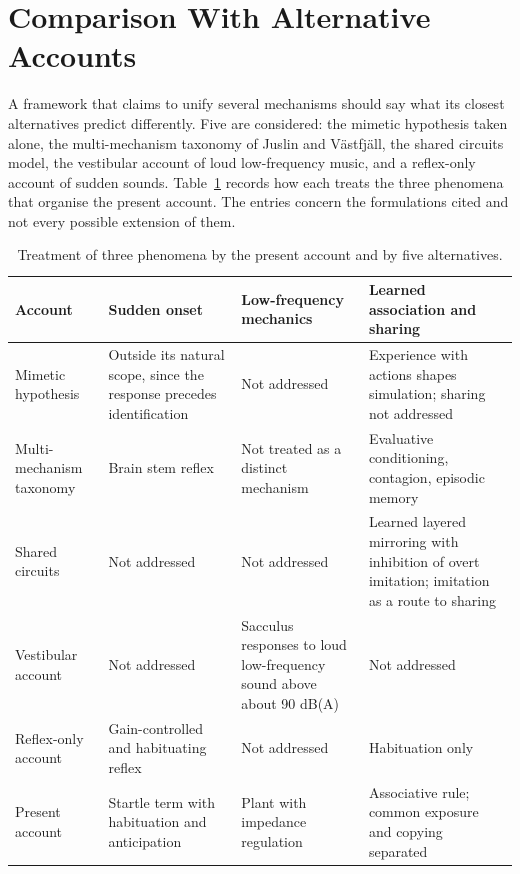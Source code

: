 \documentclass[11pt]{article}
\theoremstyle{plain}
\theoremstyle{definition}
\begin{document}
\section{Comparison With Alternative Accounts}\label{sec:compare}

A framework that claims to unify several mechanisms should say what its closest alternatives predict differently. Five are considered: the mimetic hypothesis taken alone, the multi-mechanism taxonomy of Juslin and V\"astfj\"all, the shared circuits model, the vestibular account of loud low-frequency music, and a reflex-only account of sudden sounds. Table~\ref{tab:compare} records how each treats the three phenomena that organise the present account. The entries concern the formulations cited and not every possible extension of them.

\begin{table}[t]
\centering
\small
\renewcommand{\arraystretch}{1.25}
\begin{tabular}{@{}>{\raggedright\arraybackslash}p{3.0cm}>{\raggedright\arraybackslash}p{3.7cm}>{\raggedright\arraybackslash}p{3.7cm}>{\raggedright\arraybackslash}p{4.0cm}@{}}
\toprule
Account & Sudden onset & Low-frequency mechanics & Learned association and sharing \\
\midrule
Mimetic hypothesis \citep{cox2016} & Outside its natural scope, since the response precedes identification & Not addressed & Experience with actions shapes simulation; sharing not addressed \\
Multi-mechanism taxonomy \citep{juslin2008} & Brain stem reflex & Not treated as a distinct mechanism & Evaluative conditioning, contagion, episodic memory \\
Shared circuits \citep{hurley2008} & Not addressed & Not addressed & Learned layered mirroring with inhibition of overt imitation; imitation as a route to sharing \\
Vestibular account \citep{todd2000} & Not addressed & Sacculus responses to loud low-frequency sound above about 90 dB(A) & Not addressed \\
Reflex-only account \citep{koch1999} & Gain-controlled and habituating reflex & Not addressed & Habituation only \\
Present account & Startle term with habituation and anticipation & Plant with impedance regulation & Associative rule; common exposure and copying separated \\
\bottomrule
\end{tabular}
\caption{Treatment of three phenomena by the present account and by five alternatives.}
\label{tab:compare}
\end{table}
\end{document}
